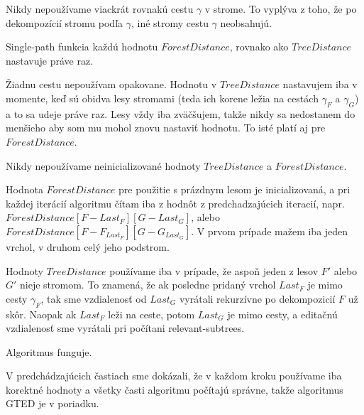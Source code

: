\begin{pozn}
  Nikdy nepoužívame viackrát rovnakú cestu $\gamma$ v strome. To vyplýva z toho, že po dekompozícií
  stromu podľa $\gamma$, iné stromy cestu $\gamma$ neobsahujú.
\end{pozn}

\begin{pozn}
  Single-path funkcia každú hodnotu $ForestDistance$, rovnako ako $TreeDistance$ nastavuje
  práve raz.
\end{pozn}

\begin{dukaz}
  Žiadnu cestu nepoužívam opakovane. Hodnotu v $TreeDistance$ nastavujem iba v momente,
  keď sú obidva lesy stromami (teda ich korene ležia na cestách $\gamma_{F}$ a $\gamma_{G}$)
  a to sa udeje práve raz.
  Lesy vždy iba zväčšujem, takže nikdy sa nedostanem do menšieho aby som mu mohol znovu nastaviť
  hodnotu. To isté platí aj pre $ForestDistance$.
\end{dukaz}

\begin{lemma}
  Nikdy nepoužívame neinicializované hodnoty $TreeDistance$ a $ForestDistance$.
\end{lemma}

\begin{dukaz}
  Hodnota $ForestDistance$ pre použitie s prázdnym lesom je inicializovaná, a pri každej iterácií
  algoritmu čítam iba z hodnôt z predchadzajúcich iteracií, napr.
  $ForestDistance[F - Last_{F}][G - Last_{G}]$, alebo $ForestDistance[F - F_{Last_{F}}][G - G_{Last_{G}}]$.
  V prvom prípade mažem iba jeden vrchol, v druhom celý jeho podstrom.

  Hodnoty $TreeDistance$ používame iba v prípade, že aspoň jeden z lesov $F'$ alebo $G'$ nieje stromom.
  To znamená, že ak posledne pridaný vrchol $Last_{F}$ je mimo cesty $\gamma_{F}$, tak sme vzdialenosť
  od $Last_{G}$ vyrátali rekurzívne po dekompozicií $F$ už skôr.
  Naopak ak $Last_{F}$ leži na ceste, potom $Last_{G}$ je mimo cesty, a editačnú vzdialenosť
  sme vyrátali pri počítani relevant-subtrees.
\end{dukaz}

\begin{dusl}
  Algoritmus funguje.
\end{dusl}

\begin{dukaz}
  V predchádzajúcich častiach sme dokázali, že v každom kroku používame iba korektné hodnoty a
  všetky časti algoritmu počítajú správne, takže algoritmus GTED je v poriadku.
\end{dukaz}

